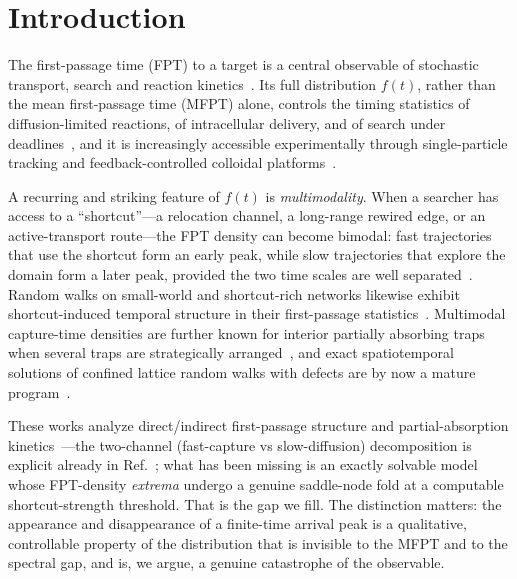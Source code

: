 \documentclass[reprint,amsmath,amssymb,aps,prresearch,longbibliography]{revtex4-2}
\begin{document}
\maketitle

\section{Introduction}\label{sec:intro}
The first-passage time (FPT) to a target is a central observable of stochastic transport, search and
reaction kinetics~\cite{Redner2001,MetzlerBook2014,Benichou2011,Condamin2007,BenichouVoituriez2014}.
Its full distribution $f(t)$, rather
than the mean first-passage time (MFPT) alone, controls the timing statistics of diffusion-limited
reactions, of intracellular delivery, and of search under
deadlines~\cite{GrebenkovMetzlerOshanin2018}, and it is increasingly accessible
experimentally through single-particle tracking and feedback-controlled colloidal
platforms~\cite{TalFriedman2020,Grebenkov2020,Bressloff2022}.

A recurring and striking feature of $f(t)$ is \emph{multimodality}. When a searcher has access to a
``shortcut''---a relocation channel, a long-range rewired edge, or an active-transport route---the FPT
density can become bimodal: fast trajectories that use the shortcut form an early peak, while slow
trajectories that explore the domain form a later peak, provided the two time scales are well
separated~\cite{GodecMetzler2016}. Random walks on small-world and shortcut-rich networks likewise
exhibit shortcut-induced temporal structure in their first-passage statistics~\cite{Almaas2003}.
Multimodal capture-time densities are further known for interior partially absorbing traps when
several traps are strategically arranged~\cite{Bressloff2022,Grebenkov2020}, and exact spatiotemporal
solutions of confined lattice random walks with defects are by now a mature
program~\cite{Giuggioli2020,MontrollWeiss1965}.

These works analyze direct/indirect first-passage structure and partial-absorption
kinetics~\cite{GodecMetzler2016,GodecMetzler2017,Bressloff2022}---the two-channel (fast-capture vs
slow-diffusion) decomposition is explicit already in Ref.~\cite{GodecMetzler2017}; what has been missing
is an exactly solvable model
whose FPT-density \emph{extrema} undergo a genuine saddle-node fold at a computable shortcut-strength
threshold. That is the gap we fill. The distinction matters: the appearance and disappearance of a
finite-time arrival peak is a qualitative, controllable property of the distribution that is invisible
to the MFPT and to the spectral gap, and is, we argue, a genuine catastrophe of the observable.
\end{document}
